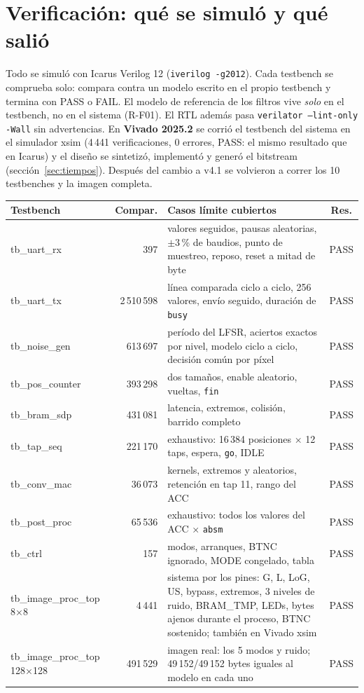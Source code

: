 \documentclass[11pt,a4paper]{article}
\begin{document}
\section{Verificación: qué se simuló y qué salió}

Todo se simuló con Icarus Verilog 12 (\texttt{iverilog -g2012}). Cada testbench se comprueba solo: compara contra un modelo escrito en el propio testbench y termina con PASS o FAIL. El modelo de referencia de los filtros vive \emph{solo} en el testbench, no en el sistema (R-F01). El RTL además pasa \texttt{verilator --lint-only -Wall} sin advertencias. En \textbf{Vivado 2025.2} se corrió el testbench del sistema en el simulador xsim (4\,441 verificaciones, 0 errores, PASS: el mismo resultado que en Icarus) y el diseño se sintetizó, implementó y generó el bitstream (sección~\ref{sec:tiempos}). Después del cambio a v4.1 se volvieron a correr los 10 testbenches y la imagen completa.

\begin{center}
\small
\begin{tabularx}{\linewidth}{>{\ttfamily}l r >{\raggedright\arraybackslash}X c}
\toprule
\normalfont\textbf{Testbench} & \textbf{Compar.} & \textbf{Casos límite cubiertos} & \textbf{Res.} \\
\midrule
tb\_uart\_rx & 397 & 256 valores seguidos, pausas aleatorias, $\pm3$\,\% de baudios, punto de muestreo, reposo, reset a mitad de byte & PASS \\
tb\_uart\_tx & 2\,510\,598 & línea comparada ciclo a ciclo, 256 valores, envío seguido, duración de \texttt{busy} & PASS \\
tb\_noise\_gen & 613\,697 & período del LFSR, aciertos exactos por nivel, modelo ciclo a ciclo, decisión común por píxel & PASS \\
tb\_pos\_counter & 393\,298 & dos tamaños, enable aleatorio, vueltas, \texttt{fin} & PASS \\
tb\_bram\_sdp & 431\,081 & latencia, extremos, colisión, barrido completo & PASS \\
tb\_tap\_seq & 221\,170 & exhaustivo: 16\,384 posiciones × 12 taps, espera, \texttt{go}, IDLE & PASS \\
tb\_conv\_mac & 36\,073 & 4 kernels, extremos y aleatorios, retención en tap 11, rango del ACC & PASS \\
tb\_post\_proc & 65\,536 & exhaustivo: todos los valores del ACC × \texttt{absm} & PASS \\
tb\_ctrl & 157 & 8 modos, arranques, BTNC ignorado, MODE congelado, tabla & PASS \\
tb\_image\_proc\_top 8×8 & 4\,441 & sistema por los pines: G, L, LoG, US, bypass, extremos, 3 niveles de ruido, BRAM\_TMP, LEDs, bytes ajenos durante el proceso, BTNC sostenido; también en Vivado xsim & PASS \\
tb\_image\_proc\_top 128×128 & 491\,529 & imagen real: los 5 modos y ruido; 49\,152/49\,152 bytes iguales al modelo en cada uno & PASS \\
\bottomrule
\end{tabularx}
\end{center}
\end{document}
